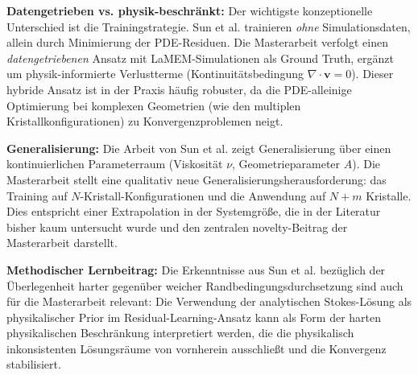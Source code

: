 \documentclass[a4paper,12pt]{article}
\begin{document}
\textbf{Datengetrieben vs. physik-beschränkt:} Der wichtigste konzeptionelle Unterschied ist die Trainingstrategie. Sun et al. trainieren \textit{ohne} Simulationsdaten, allein durch Minimierung der PDE-Residuen. Die Masterarbeit verfolgt einen \textit{datengetriebenen} Ansatz mit LaMEM-Simulationen als Ground Truth, ergänzt um physik-informierte Verlustterme (Kontinuitätsbedingung $\nabla \cdot \mathbf{v} = 0$). Dieser hybride Ansatz ist in der Praxis häufig robuster, da die PDE-alleinige Optimierung bei komplexen Geometrien (wie den multiplen Kristallkonfigurationen) zu Konvergenzproblemen neigt.

\textbf{Generalisierung:} Die Arbeit von Sun et al. zeigt Generalisierung über einen kontinuierlichen Parameterraum (Viskosität $\nu$, Geometrieparameter $A$). Die Masterarbeit stellt eine qualitativ neue Generalisierungsherausforderung: das Training auf $N$-Kristall-Konfigurationen und die Anwendung auf $N+m$ Kristalle. Dies entspricht einer Extrapolation in der Systemgröße, die in der Literatur bisher kaum untersucht wurde und den zentralen novelty-Beitrag der Masterarbeit darstellt.

\textbf{Methodischer Lernbeitrag:} Die Erkenntnisse aus Sun et al. bezüglich der Überlegenheit harter gegenüber weicher Randbedingungsdurchsetzung sind auch für die Masterarbeit relevant: Die Verwendung der analytischen Stokes-Lösung als physikalischer Prior im Residual-Learning-Ansatz kann als Form der harten physikalischen Beschränkung interpretiert werden, die die physikalisch inkonsistenten Lösungsräume von vornherein ausschließt und die Konvergenz stabilisiert.
\end{document}
